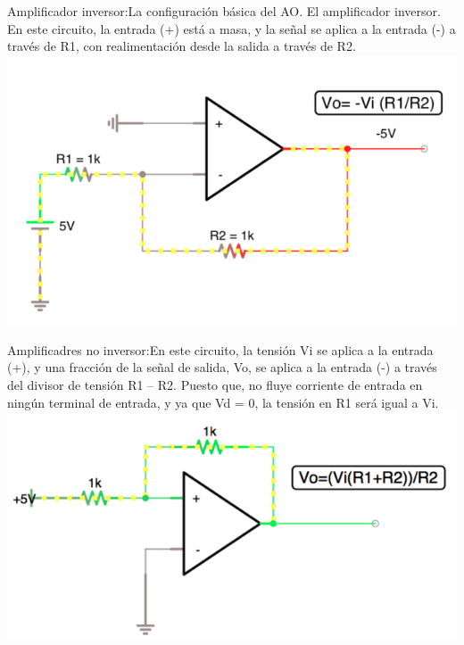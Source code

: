 \documentclass[12pt,a4paper]{article}
\begin{document}
\begin{flushleft}
Amplificador inversor:La configuración básica del AO. El amplificador inversor. En este circuito, la entrada (+) está a masa, y la señal se aplica a la entrada (-) a través de R1, con realimentación desde la salida a través de R2.
\includegraphics[wedth=7cm]{Inversor.png} 

\end{flushleft}
\begin{flushleft}
Amplificadres no inversor:En este circuito, la tensión Vi se aplica a la entrada (+), y una fracción de la señal de salida, Vo, se aplica a la entrada (-) a través del divisor de tensión R1 – R2. Puesto que, no fluye corriente de entrada en ningún terminal de entrada, y ya que Vd = 0, la tensión en R1 será igual a Vi.
\includegraphics[wedth=7cm]{no-inversor.png} 
\end{flushleft}
\end{document}
